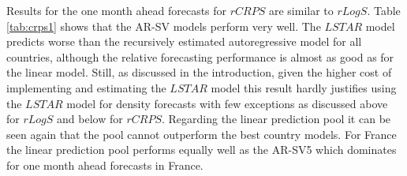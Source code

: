 \documentclass[12pt,letterpaper,fleqn]{article}           %
\begin{document}
Results for the one month ahead forecasts for $rCRPS$ are similar to $rLogS$. Table \ref{tab:crps1} shows that the AR-SV models perform very well. The $LSTAR$ model predicts worse than the recursively estimated autoregressive model for all countries, although the relative forecasting performance is almost as good as for the linear model. Still, as discussed in the introduction, given the higher cost of implementing and estimating the $LSTAR$ model this result hardly justifies using the $LSTAR$ model for density forecasts with few exceptions as discussed above for $rLogS$ and below for $rCRPS$. Regarding the linear prediction pool it can be seen again that the pool cannot outperform the best country models. For France the linear prediction pool performs equally well as the AR-SV5 which dominates for one month ahead forecasts in France. 
\end{document}
